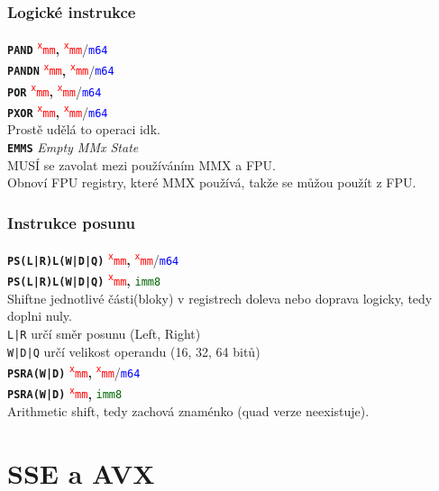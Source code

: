 \documentclass[
]{cz_sablona}
\newcommand{\reg}[1]{\texttt{\textcolor{red}{#1}}}
\newcommand{\mem}[1]{\texttt{\textcolor{blue}{#1}}}
\newcommand{\const}[1]{\texttt{\textcolor{darkgreen}{#1}}}
\newcommand{\instr}[1]{\texttt{\textbf{#1}}}
\begin{document}
\subsubsection{Logické instrukce}
\instr{PAND} \reg{\textsuperscript{x}mm}\textbf{,} \reg{\textsuperscript{x}mm}/\mem{m64}\\
\instr{PANDN} \reg{\textsuperscript{x}mm}\textbf{,} \reg{\textsuperscript{x}mm}/\mem{m64}\\
\instr{POR} \reg{\textsuperscript{x}mm}\textbf{,} \reg{\textsuperscript{x}mm}/\mem{m64}\\
\instr{PXOR} \reg{\textsuperscript{x}mm}\textbf{,} \reg{\textsuperscript{x}mm}/\mem{m64}\\
Prostě udělá to operaci idk.
\\[0.5em]
\instr{EMMS} \textit{Empty MMx State} \\
MUSÍ se zavolat mezi používáním MMX a FPU.\\
Obnoví FPU registry, které MMX používá, takže se můžou použít z FPU.

\subsubsection{Instrukce posunu}
\instr{PS(L|R)L(W|D|Q)} \reg{\textsuperscript{x}mm}\textbf{,} \reg{\textsuperscript{x}mm}/\mem{m64}\\
\instr{PS(L|R)L(W|D|Q)} \reg{\textsuperscript{x}mm}\textbf{,} \const{imm8}\\
Shiftne jednotlivé části(bloky) v registrech doleva nebo doprava logicky, tedy doplni nuly.\\
\texttt{L|R} určí směr posunu (Left, Right)\\
\texttt{W|D|Q} určí velikost operandu (16, 32, 64 bitů)
\\[0.5em]
\instr{PSRA(W|D)} \reg{\textsuperscript{x}mm}\textbf{,} \reg{\textsuperscript{x}mm}/\mem{m64}\\
\instr{PSRA(W|D)} \reg{\textsuperscript{x}mm}\textbf{,} \const{imm8}\\
Arithmetic shift, tedy zachová znaménko (quad verze neexistuje).

\section{SSE a AVX}
\end{document}
